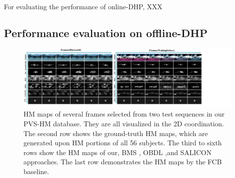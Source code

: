 \documentclass[10pt,journal,compsoc]{IEEEtran}
\begin{document}
For evaluating the performance of online-DHP, XXX





\subsection{Performance evaluation on offline-DHP}\label{sec:evaluation_offline}
\label{compare}

\begin{figure}
	\begin{center}
		\centerline{\includegraphics[width=2\columnwidth]{figures/experiment/objective_result_1}}%
		\caption{\footnotesize{HM maps of several frames selected from two test sequences in our PVS-HM database. They are all visualized in the 2D coordination.  The second row shows the ground-truth HM maps, which are generated upon HM portions of all 56 subjects. The third to sixth rows show the HM maps of our, BMS \cite{zhang2016exploiting} , OBDL \cite{hossein2015many},and {SALICON} approaches. The last row demonstrates the HM maps by the FCB baseline.}}
		\label{figure-object}
	\end{center}
\end{figure}
\end{document}
